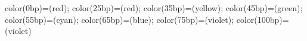 \documentclass[a4paper,12pt,oneside]{article}
\begin{document}
{color(0bp)=(red); color(25bp)=(red); color(35bp)=(yellow);
color(45bp)=(green); color(55bp)=(cyan); color(65bp)=(blue);
color(75bp)=(violet); color(100bp)=(violet)}

\begin{center}
\end{center}
\end{document}
